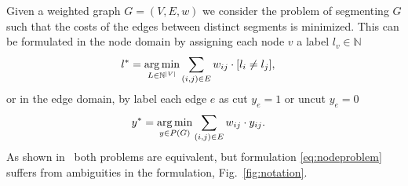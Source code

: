 Given a weighted graph $G=(V,E,w)$ we consider the problem of segmenting $G$ such that the costs
of the edges between distinct segments is minimized. This can be formulated in the node domain
by assigning each node $v$ a label $l_v \in \mathbb{N}$
\begin{align}
  l^* &= \operatorname*{arg\,min}_{L \in \mathbb{N}^{|V|}} \sum_{ (i,j) \in E } w_{ij} \cdot [l_{i} \neq l_{j}], \label{eq:nodeproblem}
\end{align} 
or in the edge domain, by label each edge $e$ as cut $y_e=1$ or uncut $y_e=0$ 
\begin{align}
  y^* &= \argmin_{y \in P(G)} \sum_{ (i,j) \in E } w_{ij} \cdot y_{ij} \label{eq:edgeproblem}.%
\end{align}
As shown in~\cite{kappes_2013_arxiv}  both problems are equivalent, but formulation \ref{eq:nodeproblem}
suffers from ambiguities in the formulation, \cf Fig.~\ref{fig:notation}. 


